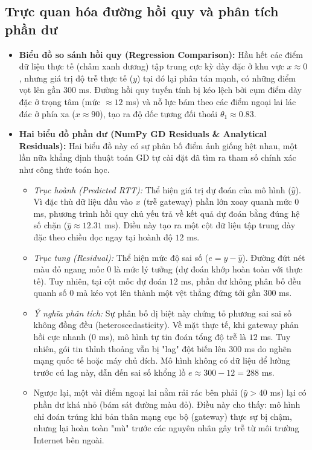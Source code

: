 \subsection{Trực quan hóa đường hồi quy và phân tích phần dư}
\begin{itemize}
    \item \textbf{Biểu đồ so sánh hồi quy (Regression Comparison):} Hầu hết các điểm dữ liệu thực tế (chấm xanh dương) tập trung cực kỳ dày đặc ở khu vực $x \approx 0$, nhưng giá trị độ trễ thực tế ($y$) tại đó lại phân tán mạnh, có những điểm vọt lên gần $300$ ms. Đường hồi quy tuyến tính bị kéo lệch bởi cụm điểm dày đặc ở trọng tâm (mức $\approx 12$ ms) và nỗ lực bám theo các điểm ngoại lai lác đác ở phía xa ($x \approx 90$), tạo ra độ dốc tương đối thoải $\theta_1 \approx 0.83$.
    
    \item \textbf{Hai biểu đồ phần dư (NumPy GD Residuals \& Analytical Residuals):} Hai biểu đồ này có sự phân bố điểm ảnh giống hệt nhau, một lần nữa khẳng định thuật toán GD tự cài đặt đã tìm ra tham số chính xác như công thức toán học.
    \begin{itemize}
        \item \textit{Trục hoành (Predicted RTT):} Thể hiện giá trị dự đoán của mô hình ($\hat{y}$). Vì đặc thù dữ liệu đầu vào $x$ (trễ gateway) phần lớn xoay quanh mức $0$ ms, phương trình hồi quy chủ yếu trả về kết quả dự đoán bằng đúng hệ số chặn ($\hat{y} \approx 12.31$ ms). Điều này tạo ra một cột dữ liệu tập trung dày đặc theo chiều dọc ngay tại hoành độ $12$ ms.
        \item \textit{Trục tung (Residual):} Thể hiện mức độ sai số ($e = y - \hat{y}$). Đường đứt nét màu đỏ ngang mốc $0$ là mức lý tưởng (dự đoán khớp hoàn toàn với thực tế). Tuy nhiên, tại cột mốc dự đoán $12$ ms, phần dư không phân bố đều quanh số $0$ mà kéo vọt lên thành một vệt thẳng đứng tới gần $300$ ms.
        \item \textit{Ý nghĩa phân tích:} Sự phân bố dị biệt này chứng tỏ phương sai sai số không đồng đều (heteroscedasticity). Về mặt thực tế, khi gateway phản hồi cực nhanh ($0$ ms), mô hình tự tin đoán tổng độ trễ là $12$ ms. Tuy nhiên, gói tin thỉnh thoảng vẫn bị "lag" đột biến lên $300$ ms do nghẽn mạng quốc tế hoặc máy chủ đích. Mô hình không có dữ liệu để lường trước cú lag này, dẫn đến sai số khổng lồ $e \approx 300 - 12 = 288$ ms.
        \item Ngược lại, một vài điểm ngoại lai nằm rải rác bên phải ($\hat{y} > 40$ ms) lại có phần dư khá nhỏ (bám sát đường màu đỏ). Điều này cho thấy: mô hình chỉ đoán trúng khi bản thân mạng cục bộ (gateway) thực sự bị chậm, nhưng lại hoàn toàn "mù" trước các nguyên nhân gây trễ từ môi trường Internet bên ngoài.
    \end{itemize}
\end{itemize}

